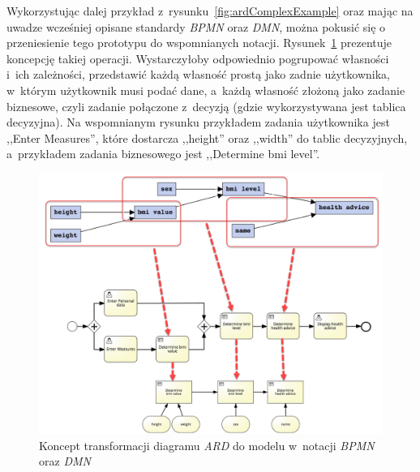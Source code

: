 Wykorzystując dalej przykład z~rysunku~\ref{fig:ardComplexExample} oraz mając na uwadze wcześniej opisane standardy \emph{BPMN} oraz \emph{DMN}, można pokusić się o przeniesienie tego prototypu do wspomnianych notacji. Rysunek~\ref{fig:ardBPMDMNFinal} prezentuje koncepcję takiej operacji. Wystarczyłoby odpowiednio pogrupować własności i~ich zależności, przedstawić każdą własność prostą jako zadnie użytkownika, w~którym użytkownik musi podać dane, a~każdą własność złożoną jako zadanie biznesowe, czyli zadanie połączone z~decyzją (gdzie wykorzystywana jest tablica decyzyjna). Na wspomnianym rysunku przykładem zadania użytkownika jest ,,Enter Measures'', które dostarcza ,,height'' oraz ,,width'' do tablic decyzyjnych, a~przykładem zadania biznesowego jest ,,Determine bmi level''.
\begin{figure}
    \centering
    \includegraphics[width=\textwidth,height=0.4\textheight,keepaspectratio]{./assets/ardBPMDMNFinal.png}
    \caption{Koncept transformacji diagramu \emph{ARD} do modelu w~notacji \emph{BPMN} oraz \emph{DMN}~\cite{ARDtoBPM}}
    \label{fig:ardBPMDMNFinal}
\end{figure} 

